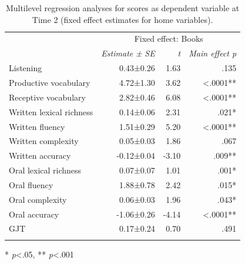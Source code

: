 \documentclass[output=paper,modfonts,nonflat,newtxmath]{langsci/langscibook}
\begin{document}
\begin{paperappendix}
\begin{table}
\caption{\label{tab:pfenninger:17} Multilevel regression analyses for scores as dependent variable at Time 2 (fixed effect estimates for home variables).}
\begin{tabularx}{0.85\textwidth}{l rrr}
\lsptoprule
& \multicolumn{3}{c}{ Fixed effect: Books}\\
\cmidrule{2-4}
 & \textit{Estimate} \textit{±} \textit{SE} & \textit{t}  & \textit{Main effect p}\\
\cmidrule{1-4}
Listening & 0.43±0.26 & 1.63 & .135  \\
Productive vocabulary & 4.72±1.30 & 3.62 & <.0001** \\
Receptive vocabulary & 2.82±0.46 & 6.08 & <.0001**  \\
Written lexical richness & 0.14±0.06 & 2.31 & .021* \\
Written fluency & 1.51±0.29 & 5.20 & <.0001**  \\
Written complexity & 0.05±0.03 & 1.86 & .067  \\
Written accuracy & -0.12±0.04 & -3.10 & .009**  \\
Oral lexical richness & 0.07±0.07 & 1.01 & .001*\\
Oral fluency & 1.88±0.78 & 2.42 & .015*  \\
Oral complexity & 0.06±0.03 & 1.96 & .043*  \\
Oral accuracy & -1.06±0.26 & -4.14 & <.0001** \\
GJT & 0.17±0.24 & 0.70 & .491  \\
	\lspbottomrule
\end{tabularx}

* \textit{p}<.05, ** \textit{p}<.001
\end{table}


\end{paperappendix}
\end{document}
